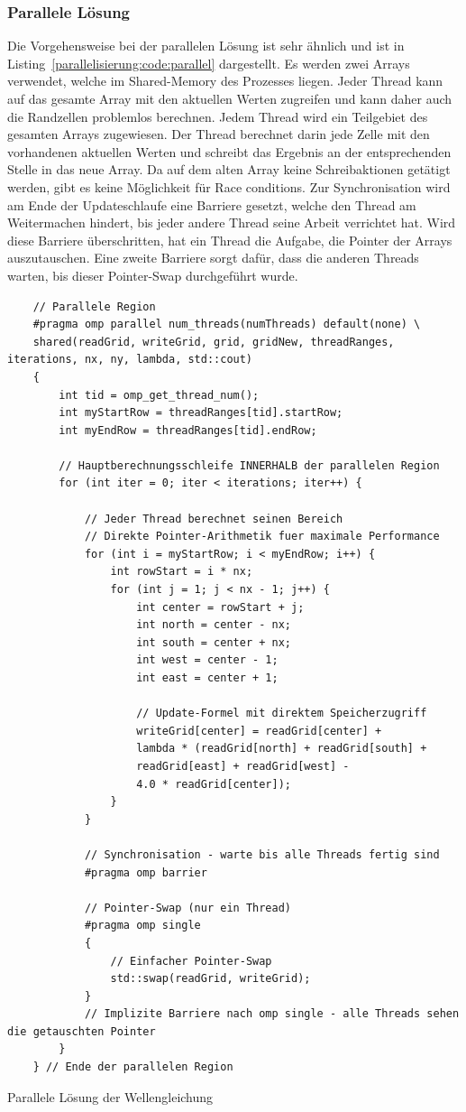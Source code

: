 \subsubsection{Parallele Lösung 
\label{parallelisierung:sub:parLoesung}}
Die Vorgehensweise bei der parallelen Lösung ist sehr ähnlich und ist in Listing~\ref{parallelisierung:code:parallel}
dargestellt.
Es werden zwei Arrays verwendet, welche im Shared-Memory des Prozesses liegen.
Jeder Thread kann auf das gesamte Array mit den aktuellen Werten zugreifen und kann daher auch die Randzellen problemlos berechnen.
Jedem Thread wird ein Teilgebiet des gesamten Arrays zugewiesen.
Der Thread berechnet darin jede Zelle mit den vorhandenen aktuellen Werten und schreibt das Ergebnis an der entsprechenden Stelle in das neue Array.
Da auf dem alten Array keine Schreibaktionen getätigt werden, gibt es keine Möglichkeit für Race conditions.
Zur Synchronisation wird am Ende der Updateschlaufe eine Barriere gesetzt, welche den Thread am Weitermachen hindert, bis jeder andere Thread seine Arbeit verrichtet hat.
Wird diese Barriere überschritten, hat ein Thread die Aufgabe, die Pointer der Arrays auszutauschen.
Eine zweite Barriere sorgt dafür, dass die anderen Threads warten, bis dieser Pointer-Swap durchgeführt wurde.

\begin{lstfloat}
\lstset{frame=none}
\begin{lstlisting}
	// Parallele Region
	#pragma omp parallel num_threads(numThreads) default(none) \
	shared(readGrid, writeGrid, grid, gridNew, threadRanges, iterations, nx, ny, lambda, std::cout)
	{
		int tid = omp_get_thread_num();
		int myStartRow = threadRanges[tid].startRow;
		int myEndRow = threadRanges[tid].endRow;
		
		// Hauptberechnungsschleife INNERHALB der parallelen Region
		for (int iter = 0; iter < iterations; iter++) {
			
			// Jeder Thread berechnet seinen Bereich
			// Direkte Pointer-Arithmetik fuer maximale Performance
			for (int i = myStartRow; i < myEndRow; i++) {
				int rowStart = i * nx;
				for (int j = 1; j < nx - 1; j++) {
					int center = rowStart + j;
					int north = center - nx;
					int south = center + nx;
					int west = center - 1;
					int east = center + 1;
					
					// Update-Formel mit direktem Speicherzugriff
					writeGrid[center] = readGrid[center] +
					lambda * (readGrid[north] + readGrid[south] +
					readGrid[east] + readGrid[west] -
					4.0 * readGrid[center]);
				}
			}
			
			// Synchronisation - warte bis alle Threads fertig sind
			#pragma omp barrier
			
			// Pointer-Swap (nur ein Thread)
			#pragma omp single
			{
				// Einfacher Pointer-Swap
				std::swap(readGrid, writeGrid);
			}
			// Implizite Barriere nach omp single - alle Threads sehen die getauschten Pointer
		}
	} // Ende der parallelen Region
\end{lstlisting}
\caption{Parallele Lösung der Wellengleichung
\label{parallelisierung:code:parallel}}
\end{lstfloat}
	
